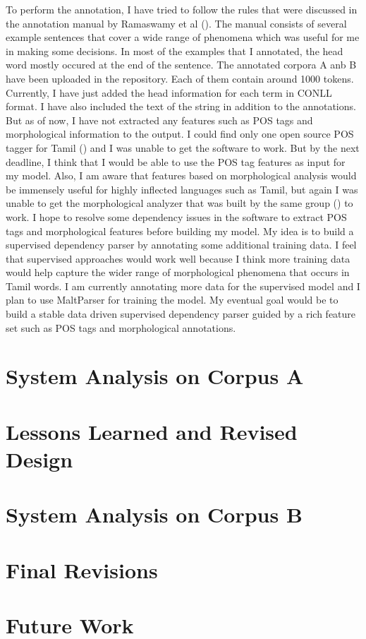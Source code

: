 \documentclass[11pt,letterpaper]{article}
\begin{document}
To perform the annotation, I have tried to follow the rules that were discussed in the annotation manual by Ramaswamy et al (\cite{ramReport}).
The manual consists of several example sentences that cover a wide range of phenomena which was useful for me in making
some decisions. In most of the examples that I annotated, the head word mostly occured at the end of the sentence. The annotated corpora A anb B have been uploaded in the repository. Each of them contain around 1000 tokens. Currently, I have just added the head information for each term
in CONLL format. I have also included the text of the string in addition to the annotations. But as of now, I have not extracted any features such as 
POS tags and morphological information to the output. I could find only one open source POS tagger for Tamil (\cite{dhanalakshmi2010natural}) and I was unable to get the software
to work. But by the next deadline, I think that I would be able to use the POS tag features as input for my model. Also, I am aware that features based
on morphological analysis would be immensely useful for highly inflected languages such as Tamil, but again I was unable to get the morphological 
analyzer that was built by the same group (\cite{dhanalakshmi2010natural}) to work. I hope to resolve some dependency issues in the software to extract
POS tags and morphological features before building my model. My idea is to build a supervised dependency parser by annotating some additional training data. 
I feel that supervised approaches would work well because I think more training data would help capture the wider range of morphological phenomena that occurs in Tamil words. 
I am currently annotating more data for the supervised model and I plan to use MaltParser for training the model. My eventual goal would be
to build a stable data driven supervised dependency parser guided by a rich feature set such as POS tags and morphological annotations. 

\section{System Analysis on Corpus A}

\section{Lessons Learned and Revised Design}

\section{System Analysis on Corpus B}

\section{Final Revisions}

\section{Future Work}




\label{lastpage}
\end{document}
